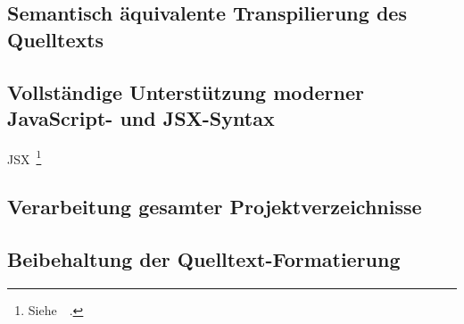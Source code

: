   \subsection{Semantisch äquivalente Transpilierung des Quelltexts}
  \label{subsection:requirement:semantic-equivalence}

  \subsection{Vollständige Unterstützung moderner JavaScript- und JSX-Syntax}
  \label{subsection:requirement:modern-js-support}

  JSX~\footnote{Siehe~~\autocite{SOFTWARE:JSX}.}

  \subsection{Verarbeitung gesamter Projektverzeichnisse}
  \label{subsection:requirement:batch-processing}

  \subsection{Beibehaltung der Quelltext-Formatierung}
  \label{subsection:requirement:format}
